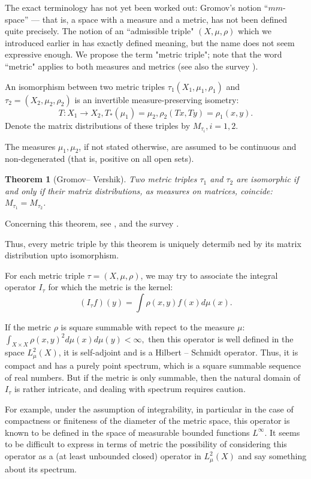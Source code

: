 \documentclass[11pt]{article}
\newtheorem{theorem}{Theorem}
\begin{document}
The exact terminology has not yet been worked out: Gromov's notion \cite{Gr}  ``$mm$-space'' --- that is, a
space with a measure and a metric, has not been defined quite precisely. 
The notion of an ``admissible triple" $(X,\mu,\rho)$ which we introduced earlier in \cite{VPZ} has
 exactly defined meaning, but the name does not seem expressive enough.
 We propose the term "metric triple"; note that the  word ``metric" applies to 
 both measures and metrics (see also the survey \cite{VVZ}).

An isomorphism between two metric triples $\tau_1(X_1,\mu_1,\rho_1)$ and
 $\tau_2=(X_2,\mu_2,\rho_2)$ is an invertible measure-preserving isometry: 
 $$T:X_1\to X_2, T_*(\mu_1)=\mu_2, \rho_2(Tx,Ty)=\rho_1(x,y).$$
Denote the matrix distributions of these triples by $M_{\tau_i}, i=1,2$.

The measures $\mu_1,\mu_2$, if not stated otherwise, are assumed to be continuous and
non-degenerated (that is, positive on all open sets).

\begin{theorem}[Gromov-- Vershik] Two metric triples
 $\tau_1$ and $\tau_2$ are isomorphic if and only if
 their matrix distributions, as measures on matrices, coincide: $M_{\tau_1}= M_{\tau_2}$.
\end{theorem}

Concerning this theorem, see \cite{Gr,Ve}, and the survey \cite{VVZ}.

Thus, every metric triple by this theorem is uniquely determib  ned by its matrix distribution upto isomorphism.

For each metric triple $\tau=(X,\mu,\rho)$, we may try to associate the integral operator
$I_\tau$ for which the metric is the kernel: $$(I_{\tau}f)(y)=\int \rho(x,y)f(x)d\mu(x).$$

If the metric $\rho$ is square summable with repect to the measure
 $\mu$: $\int_{X \times X}\rho(x,y)^2 d\mu(x)d\mu(y)<\infty,$ then this operator
 is well defined in the space $L^2_{\mu}(X)$, it is self-adjoint and is a Hilbert -- Schmidt operator. 
 Thus, it is compact and has a purely point spectrum, which is a square summable sequence of real
 numbers. But if the metric is only summable, then the
 natural domain of $I_{\tau}$ is rather intricate,  and dealing with spectrum requires  caution.
 
 
For example, under the assumption of integrability, in particular in the case of compactness or finiteness of the diameter of the metric space, this operator is known to be defined in the space of measurable bounded functions $L^{\infty}$.
It seems to be difficult to express in terms of metric the possibility of considering
this operator as a (at least unbounded closed) operator in $L^2_{\mu}(X)$ and say something about its spectrum.
\end{document}
